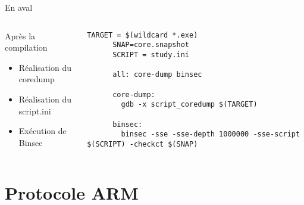 \documentclass[A4,svgnames,9pt,aspectratio=169]{beamer}
\begin{document}
\begin{frame}{En aval}

  \begin{columns}
    \begin{column}{0.3\textwidth}
      \begin{block}{Après la compilation}
        \begin{itemize}
          \item Réalisation du coredump
          \item Réalisation du script.ini
          \item Exécution de Binsec
        \end{itemize}
      \end{block}      
    \end{column}
  
  
    \begin{column}{0.7\textwidth}
    \begin{lstlisting}[style=MakefileStyle, caption={Makefile}, gobble=6]
      TARGET = $(wildcard *.exe)
      SNAP=core.snapshot
      SCRIPT = study.ini

      all: core-dump binsec

      core-dump: 
        gdb -x script_coredump $(TARGET)

      binsec:
        binsec -sse -sse-depth 1000000 -sse-script $(SCRIPT) -checkct $(SNAP)
    \end{lstlisting}
    \end{column}
    \end{columns}
  
\end{frame}


\section{Protocole ARM}
\frame{\sectionpage}

\end{document}
